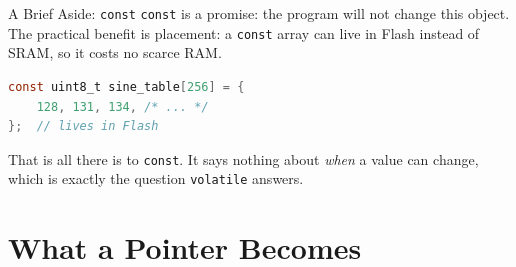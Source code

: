 \documentclass[9pt,aspectratio=169,xcolor=table]{beamer}
\begin{document}
\begin{frame}[fragile]{A Brief Aside: \texttt{const}}
    \leavevmode
    \texttt{const} is a promise: the program will not change this
    object. The practical benefit is \alert{placement}: a
    \texttt{const} array can live in Flash instead of SRAM, so it
    costs no scarce RAM.

    \vspace{3mm}
\begin{lstlisting}[language=C, basicstyle=\ttfamily\normalsize]
const uint8_t sine_table[256] = {
    128, 131, 134, /* ... */
};  // lives in Flash
\end{lstlisting}

    \vspace{3mm}
    {\small That is all there is to \texttt{const}. It says nothing
    about \emph{when} a value can change, which is exactly the question
    \texttt{volatile} answers.}
\end{frame}

\section{What a Pointer Becomes}
\end{document}
